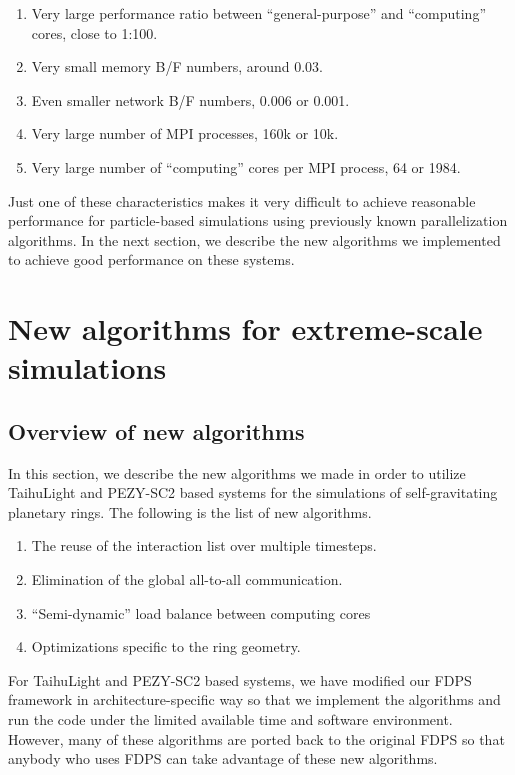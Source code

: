 \documentclass[conference]{IEEEtran}
\begin{document}
\begin{enumerate}



\item Very large performance ratio between ``general-purpose''
  and ``computing'' cores, close to 1:100.
\item  Very small memory  B/F numbers, around 0.03.
\item  Even smaller network B/F numbers, 0.006 or 0.001.
\item Very large number of MPI processes, 160k  or 10k.
\item Very large number of ``computing'' cores per MPI process, 64 or 1984.  
\end{enumerate}

Just one of these characteristics makes it very difficult to achieve
reasonable performance for particle-based simulations using previously
known parallelization algorithms. In the next section, we describe the
new algorithms we implemented to achieve good performance on these systems.



\section{New algorithms for extreme-scale simulations}
\label{sect:innovation}

  \subsection{Overview of new algorithms}

  
In this section, we describe the new algorithms we made in order to
utilize TaihuLight and PEZY-SC2 based systems for the simulations of self-gravitating
planetary rings. The following is the list of new algorithms.


\begin{enumerate}
\item The reuse of the interaction list over multiple timesteps.
\item Elimination of  the global all-to-all communication.
\item ``Semi-dynamic'' load balance between computing cores
\item Optimizations specific to the ring geometry.
\end{enumerate}  

For TaihuLight and PEZY-SC2 based systems, we have modified our FDPS
framework in architecture-specific way so that we implement the
algorithms and run the code under the limited available time and
software environment. However, many of these algorithms are ported
back to the original FDPS so that anybody who uses FDPS can take
advantage of these new algorithms.
\end{document}
